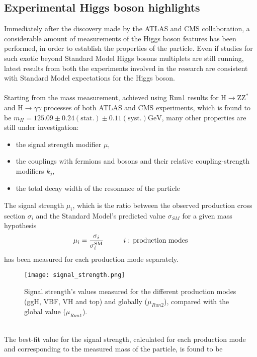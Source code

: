 \subsection{Experimental Higgs boson highlights}
Immediately after the discovery made by the ATLAS and CMS collaboration\cite{Observation_Higgs}, a considerable amount of measurements of the Higgs boson features has been performed, in order to establish the properties of the particle. Even if studies for such exotic beyond Standard Model Higgs bosons multiplets are still running, latest results from both the experiments involved in the research are consistent with Standard Model expectations for the Higgs boson.
\\\\
Starting from the mass measurement, achieved using Run1 results for $\text{H} \rightarrow \text{ZZ}^*$ and $\text{H} \rightarrow \gamma\gamma$ processes of both ATLAS and CMS experiments, which is found to be $m_H = 125.09 \pm 0.24 (\text{stat.}) \pm 0.11 (\text{syst.}) \text{GeV}$\cite{Aad2015zhl}, many other properties are still under investigation:
\begin{itemize}
\item the signal strength modifier $\mu$,
\item the couplings with fermions and bosons and their relative coupling-strength modifiers $k_j$,
\item the total decay width of the resonance of the particle
\end{itemize}
The signal strength $\mu_i$, which is the ratio between the observed production cross section $\sigma_i$ and the Standard Model's predicted value $\sigma_{SM}$ for a given mass hypothesis
\begin{equation}
\mu_i = \frac{\sigma_i}{\sigma_i^\text{SM}} \hspace{1cm} i \hspace{0.1cm} \text{: production modes}
\end{equation}
has been measured for each production mode separately.
\phantom{i}
\\
\phantom{i}
\begin{figure}[htb]
\centering
\texttt{[image: signal\_strength.png]}
\caption{Signal strength's values measured for the different production modes (ggH, VBF, VH and top) and globally ($\mu_{Run2}$), compared with the global value ($\mu_{Run1}$).}
\end{figure}
\\The best-fit value for the signal strength, calculated for each production mode and corresponding to the measured mass of the particle, is found to be 
